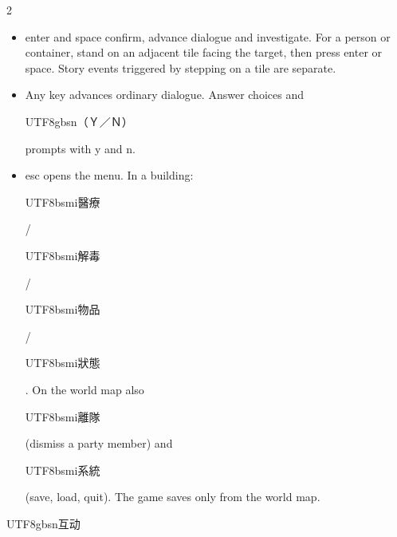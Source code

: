 \begin{paracol}{2}
\begin{itemize}[leftmargin=*,topsep=1pt,itemsep=0pt,parsep=0pt]\item enter and space confirm, advance dialogue and investigate. For a person or container, stand on an adjacent tile facing the target, then press enter or space. Story events triggered by stepping on a tile are separate.\item Any key advances ordinary dialogue. Answer choices and \begin{CJK}{UTF8}{gbsn}（Ｙ／Ｎ）\end{CJK} prompts with y and n.\item esc opens the menu. In a building: \begin{CJK}{UTF8}{bsmi}醫療\end{CJK} / \begin{CJK}{UTF8}{bsmi}解毒\end{CJK} / \begin{CJK}{UTF8}{bsmi}物品\end{CJK} / \begin{CJK}{UTF8}{bsmi}狀態\end{CJK}. On the world map also \begin{CJK}{UTF8}{bsmi}離隊\end{CJK} (dismiss a party member) and \begin{CJK}{UTF8}{bsmi}系統\end{CJK} (save, load, quit). The game saves only from the world map.\end{itemize}
\switchcolumn
\footnotesize\setlength{\parskip}{2pt}
{\footnotesize\bfseries \begin{CJK}{UTF8}{gbsn}互动\end{CJK}\par}

\end{paracol}
